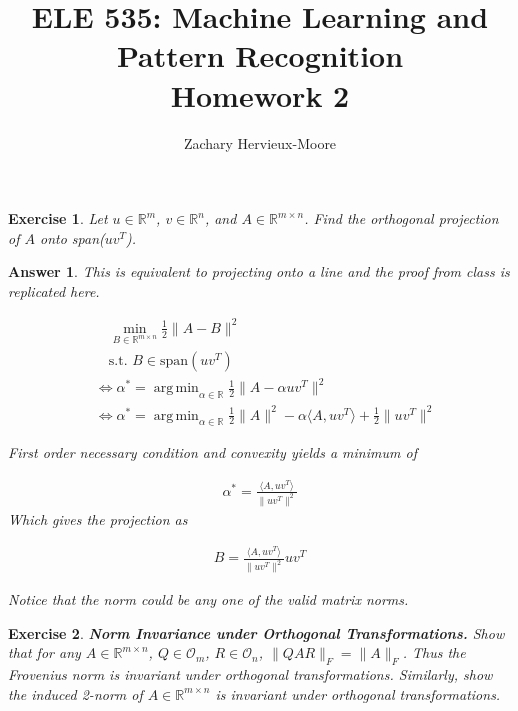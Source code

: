 \documentclass[12pt]{article}
\title{ELE 535: Machine Learning and Pattern Recognition \\ Homework 2}
\author{Zachary Hervieux-Moore}
\date{\displaydate{date}}
\DeclareMathOperator*{\argmin}{arg\,min}
\theoremstyle{colon}
\newtheorem{exercise}{Exercise}
\newtheorem*{answer}{Answer}
\begin{document}
\maketitle

\clearpage

\begin{exercise}
  Let $u \in \mathbb{R}^m$, $v \in \mathbb{R}^n$, and $A \in \mathbb{R}^{m \times n}$. Find the orthogonal projection of $A$ onto span($u v^T$).
\end{exercise}

\begin{answer}
  This is equivalent to projecting onto a line and the proof from class is replicated here.

  \begin{align*}
    &\quad \min_{B \in \mathbb{R}^{m \times n}} \frac{1}{2} \lVert A - B \rVert^2 \\
    &\quad \text{s.t. } B \in \text{span}(u v^T) \\
    &\Longleftrightarrow \alpha^* = \argmin_{\alpha \in \mathbb{R}} \frac{1}{2} \lVert A - \alpha u v^T \rVert^2 \\
    &\Longleftrightarrow \alpha^* = \argmin_{\alpha \in \mathbb{R}} \frac{1}{2} \lVert A \rVert^2 - \alpha \langle A, u v^T \rangle + \frac{1}{2} \lVert u v^T \rVert^2
  \end{align*}

  First order necessary condition and convexity yields a minimum of

  \begin{gather*}
    \alpha^* = \frac{\langle A, u v^T \rangle}{\lVert u v^T \rVert^2}
  \end{gather*}
  Which gives the projection as

  \begin{gather*}
    B = \frac{\langle A, u v^T \rangle}{\lVert u v^T \rVert^2} u v^T
  \end{gather*}

  Notice that the norm could be any one of the valid matrix norms.
\end{answer}

\clearpage

\begin{exercise}
  \textbf{Norm Invariance under Orthogonal Transformations.} Show that for any $A \in \mathbb{R}^{m \times n}$, $Q \in \mathcal{O}_m$, $R \in \mathcal{O}_n$, $\lVert QAR \rVert_F = \lVert A \rVert_F$. Thus the Frovenius norm is invariant under orthogonal transformations. Similarly, show the induced 2-norm of $A \in \mathbb{R}^{m \times n}$ is invariant under orthogonal transformations.
\end{exercise}
\end{document}
